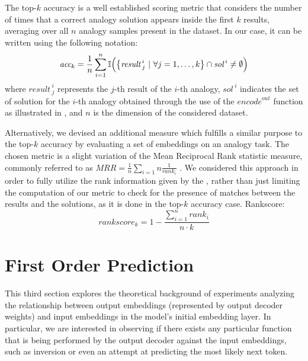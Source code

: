 The top-$k$ accuracy is a well established scoring metric that considers the number of times that a correct analogy solution appears inside the first $k$ results, averaging over all $n$ analogy samples present in the dataset.
In our case, it can be written using the following notation:
\begin{equation}
    \label{eq:method_embeddings_topk-accuracy}
    \textit{acc}_k = \frac{1}{n} \sum_{i=1}^{n} \mathbb{I}\Bigl( {\left\{ {\textit{result}\,}^i_j \ |\ \forall j = 1,\ldots,k \right\}} \cap {\textit{sol}\,}^i \neq \emptyset \Bigr)
\end{equation}
where ${\textit{result}\,}^i_j$ represents the $j$-th result of the $i$-th analogy, ${\textit{sol}\,}^i$ indicates the set of solution for the $i$-th analogy obtained through the use of the ${\textit{encode}}^{out}$ function as illustrated in , and $n$ is the dimension of the considered dataset.

Alternatively, we devised an additional measure which fulfills a similar purpose to the top-$k$ accuracy by evaluating a set of embeddings on an analogy task.
The chosen metric is a slight variation of the Mean Reciprocal Rank statistic measure, commonly referred to as $MRR = \frac{1}{n}\sum_{i=1}{n}{\frac{1}{rank_i}}$ .
We considered this approach in order to fully utilize the rank information given by the , rather than just limiting the computation of our metric to check for the presence of matches between the results and the solutions, as it is done in the top-$k$ accuracy case.
Rankscore:
\begin{equation}
    \label{eq:method_embeddings_rankscore}
    \textit{rankscore}_k = 1 - \frac{\sum_{i=1}^{n}{rank_i}}{n \cdot k}
\end{equation}


\section{First Order Prediction}

This third section explores the theoretical background of experiments analyzing the relationship between output embeddings (represented by output decoder weights) and input embeddings in the model's initial embedding layer.
In particular, we are interested in observing if there exists any particular function that is being performed by the output decoder against the input embeddings, such as inversion or even an attempt at predicting the most likely next token.

